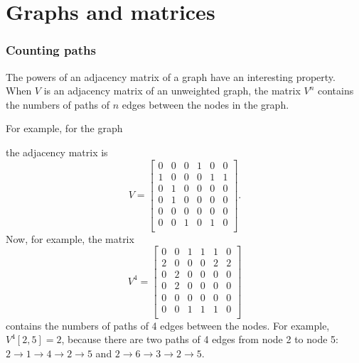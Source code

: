 \section{Graphs and matrices}

\subsubsection{Counting paths}

The powers of an adjacency matrix of a graph
have an interesting property.
When $V$ is an adjacency matrix of an unweighted graph,
the matrix $V^n$ contains the numbers of paths of
$n$ edges between the nodes in the graph.

For example, for the graph
\begin{center}
\end{center}
the adjacency matrix is
\[
V= \begin{bmatrix}
  0 & 0 & 0 & 1 & 0 & 0 \\
  1 & 0 & 0 & 0 & 1 & 1 \\
  0 & 1 & 0 & 0 & 0 & 0 \\
  0 & 1 & 0 & 0 & 0 & 0 \\
  0 & 0 & 0 & 0 & 0 & 0 \\
  0 & 0 & 1 & 0 & 1 & 0 \\
 \end{bmatrix}.
\]
Now, for example, the matrix
\[
V^4= \begin{bmatrix}
  0 & 0 & 1 & 1 & 1 & 0 \\
  2 & 0 & 0 & 0 & 2 & 2 \\
  0 & 2 & 0 & 0 & 0 & 0 \\
  0 & 2 & 0 & 0 & 0 & 0 \\
  0 & 0 & 0 & 0 & 0 & 0 \\
  0 & 0 & 1 & 1 & 1 & 0 \\
 \end{bmatrix}
\]
contains the numbers of paths of 4 edges
between the nodes.
For example, $V^4[2,5]=2$,
because there are two paths of 4 edges
from node 2 to node 5:
$2 \rightarrow 1 \rightarrow 4 \rightarrow 2 \rightarrow 5$
and 
$2 \rightarrow 6 \rightarrow 3 \rightarrow 2 \rightarrow 5$.

